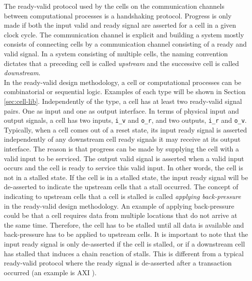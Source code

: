 The ready-valid protocol used by the cells on the communication channels between computational processes is a handshaking protocol. Progress is only made if both the input valid and ready signal are asserted for a cell in a given clock cycle. The communication channel is explicit and building a system mostly consists of connecting cells by a communication channel consisting of a ready and valid signal. In a system consisting of multiple cells, the naming convention dictates that a preceding cell is called \textit{upstream} and the successive cell is called \textit{downstream}.\\
In the ready-valid design methodology, a cell or computational processes can be combinatorial or sequential logic. Examples of each type will be shown in Section \ref{sec:cell-lib}. Independently of the type, a cell has at least two ready-valid signal pairs. One as input and one as output interface. In terms of physical input and output signals, a cell has two inputs, \texttt{i\_v} and \texttt{o\_r}, and two outputs, \texttt{i\_r} and \texttt{o\_v}.\\
Typically, when a cell comes out of a reset state, its input ready signal is asserted independently of any downstream cell ready signals it may receive at its output interface. The reason is that progress can be made by supplying the cell with a valid input to be serviced. The output valid signal is asserted when a valid input occurs and the cell is ready to service this valid input. In other words, the cell is not in a stalled state. If the cell is in a stalled state, the input ready signal will be de-asserted to indicate the upstream cells that a stall occurred. The concept of indicating to upstream cells that a cell is stalled is called \textit{applying back-pressure} in the ready-valid design methodology. An example of applying back-pressure could be that a cell requires data from multiple locations that do not arrive at the same time. Therefore, the cell has to be stalled until all data is available and back-pressure has to be applied to upstream cells. It is important to note that the input ready signal is only de-asserted if the cell is stalled, or if a downstream cell has stalled that induces a chain reaction of stalls. This is different from a typical ready-valid protocol where the ready signal is de-asserted after a transaction occurred (an example is AXI \cite{amba4}).



